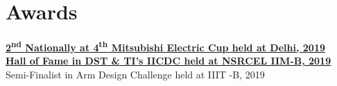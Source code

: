 \documentclass[]{deedy-resume-openfont}
\begin{document}
\begin{minipage}[t]{0.32\textwidth}
\sectionsep
\section{Awards}
\small{
\textbullet{} \textbf{\href{https://mitsubishielectric.in/fa/mecup/winners.php}{2\textsuperscript{nd} Nationally at 4\textsuperscript{th} Mitsubishi Electric Cup held at Delhi, 2019}} \ExternalLink\\
\vspace{1mm}
\textbullet{} \textbf{\href{https://blog.mygov.in/wp-content/uploads/2019/08/Top-30-Finalists_Wall-Of-Fame.pdf}{Hall of Fame in DST \& TI’s IICDC held at NSRCEL IIM-B, 2019}} \ExternalLink\\
\vspace{1mm}
\textbullet{} Semi-Finalist in Arm Design Challenge held at IIIT -B, 2019\\
}

%
%

\end{minipage} 
\hfill
\end{document}
